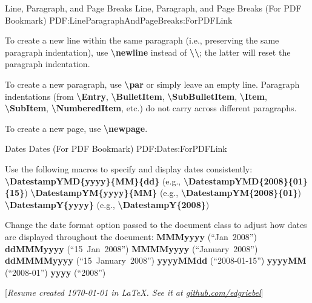 \documentclass[letterpaper,MMMMyyyy,nonstopmode]{simpleresumecv}
\newcommand{\CVNote}{Resume created {\today} in \LaTeX. See it at \href{https://github.com/edgriebel/resume-cv}{\underline{github.com/edgriebel}}}
\newcommand{\Code}[1]{\mbox{\textbf{#1}}}
\newcommand{\CodeCommand}[1]{\mbox{\textbf{\textbackslash{#1}}}}
\begin{document}
\begin{Body}
\BigGap
\SubSection
{Line, Paragraph, and Page Breaks}
{Line, Paragraph, and Page Breaks (For PDF Bookmark)}
{PDF:LineParagraphAndPageBreaks:ForPDFLink}

\Gap
\BulletItem
To create a new line within the same paragraph (i.e., preserving the same paragraph indentation), use \CodeCommand{newline} instead of \CodeCommand{\textbackslash};
the latter will reset the paragraph indentation.

\Gap
\BulletItem
To create a new paragraph, use \CodeCommand{par} or simply leave an empty line.
Paragraph indentations (from
\CodeCommand{Entry},
\CodeCommand{BulletItem},
\CodeCommand{SubBulletItem},
\CodeCommand{Item},
\CodeCommand{SubItem},
\CodeCommand{NumberedItem},
etc.) do not carry across different paragraphs.

\Gap
\BulletItem
To create a new page, use \CodeCommand{newpage}.

\BigGap
\SubSection
{Dates}
{Dates (For PDF Bookmark)}
{PDF:Dates:ForPDFLink}

\Gap
\BulletItem
Use the following macros to specify and display dates consistently:
\SubBulletItem
\CodeCommand{DatestampYMD\{yyyy\}\{MM\}\{dd\}}
(e.g., \CodeCommand{DatestampYMD\{2008\}\{01\}\{15\}})
\SubBulletItem
\CodeCommand{DatestampYM\{yyyy\}\{MM\}}
(e.g., \CodeCommand{DatestampYM\{2008\}\{01\}})
\SubBulletItem
\CodeCommand{DatestampY\{yyyy\}}
(e.g., \CodeCommand{DatestampY\{2008\}})

\Gap
\BulletItem
Change the date format option passed to the document class to adjust how dates are displayed throughout the document:
\SubBulletItem
\Code{MMMyyyy} (``Jan~2008'')
\SubBulletItem
\Code{ddMMMyyyy} (``15~Jan~2008'')
\SubBulletItem
\Code{MMMMyyyy} (``January~2008'')
\SubBulletItem
\Code{ddMMMMyyyy} (``15~January~2008'')
\SubBulletItem
\Code{yyyyMMdd} (``2008-01-15'')
\SubBulletItem
\Code{yyyyMM} (``2008-01'')
\SubBulletItem
\Code{yyyy} (``2008'')

\endgroup

\fi

\end{Body}


\UseNoteFont%
\null\hfill%
[\textit{\CVNote}]
\end{document}
